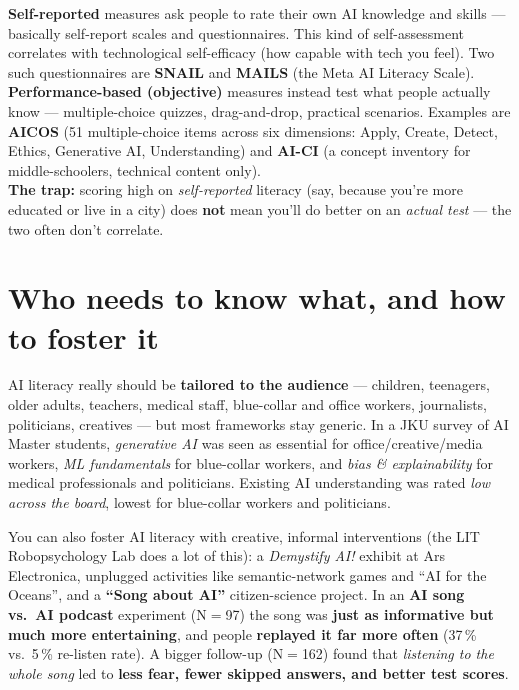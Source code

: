 \documentclass[11pt, oneside]{book}
\begin{document}
\begin{thmbox}[title={Self-reported vs.\ performance-based AI literacy}]
\textbf{Self-reported} measures ask people to rate their own AI knowledge and
skills — basically self-report scales and questionnaires. This kind of
self-assessment correlates with technological self-efficacy (how capable with
tech you feel). Two such questionnaires are \textbf{SNAIL} and \textbf{MAILS}
(the Meta AI Literacy Scale).\\
\textbf{Performance-based (objective)} measures instead test what people
actually know — multiple-choice quizzes, drag-and-drop, practical scenarios.
Examples are \textbf{AICOS} (51 multiple-choice items across six dimensions:
Apply, Create, Detect, Ethics, Generative AI, Understanding) and \textbf{AI-CI}
(a concept inventory for middle-schoolers, technical content only).\\
\textbf{The trap:} scoring high on \emph{self-reported} literacy (say, because
you're more educated or live in a city) does \textbf{not} mean you'll do
better on an \emph{actual test} — the two often don't correlate.
\end{thmbox}

\section{Who needs to know what, and how to foster it}

AI literacy really should be \textbf{tailored to the audience} — children,
teenagers, older adults, teachers, medical staff, blue-collar and office
workers, journalists, politicians, creatives — but most frameworks stay
generic. In a JKU survey of AI Master students, \emph{generative AI} was seen
as essential for office/creative/media workers, \emph{ML fundamentals} for
blue-collar workers, and \emph{bias \& explainability} for medical
professionals and politicians. Existing AI understanding was rated \emph{low
across the board}, lowest for blue-collar workers and politicians.

You can also foster AI literacy with creative, informal interventions (the LIT
Robopsychology Lab does a lot of this): a \emph{Demystify AI!} exhibit at Ars
Electronica, unplugged activities like semantic-network games and ``AI for the
Oceans'', and a \textbf{``Song about AI''} citizen-science project. In an
\textbf{AI song vs.\ AI podcast} experiment (N$=$97) the song was \textbf{just
as informative but much more entertaining}, and people \textbf{replayed it far
more often} (37\,\% vs.\ 5\,\% re-listen rate). A bigger follow-up (N$=$162)
found that \emph{listening to the whole song} led to \textbf{less fear, fewer
skipped answers, and better test scores}.
\end{document}
